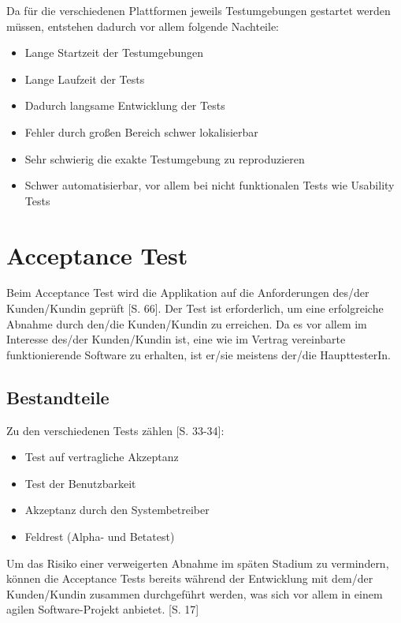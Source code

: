 \documentclass[a4paper,bibtotoc,oneside]{scrbook}
\begin{document}
Da für die verschiedenen Plattformen jeweils Testumgebungen gestartet werden müssen, entstehen dadurch vor allem folgende Nachteile:

\begin{itemize}
  \item Lange Startzeit der Testumgebungen
  \item Lange Laufzeit der Tests
  \item Dadurch langsame Entwicklung der Tests
  \item Fehler durch großen Bereich schwer lokalisierbar
  \item Sehr schwierig die exakte Testumgebung zu reproduzieren
  \item Schwer automatisierbar, vor allem bei nicht funktionalen Tests wie Usability Tests
\end{itemize}


\chapter{Acceptance Test}
Beim Acceptance Test wird die Applikation auf die Anforderungen des/der Kunden/Kundin geprüft \cite{test_large_systems}[S. 66]. Der Test ist erforderlich, um eine erfolgreiche Abnahme durch den/die Kunden/Kundin zu erreichen. Da es vor allem im Interesse des/der Kunden/Kundin ist, eine wie im Vertrag vereinbarte funktionierende Software zu erhalten, ist er/sie meistens der/die HaupttesterIn.

\section{Bestandteile}
Zu den verschiedenen Tests zählen \cite{betrieb}[S. 33-34]:

\begin{itemize}
   \item \glqq Test auf vertragliche Akzeptanz\grqq
   \item \glqq Test der Benutzbarkeit\grqq
   \item \glqq Akzeptanz durch den Systembetreiber\grqq
   \item \glqq Feldrest (Alpha- und Betatest)\grqq
 \end{itemize}

Um das Risiko einer verweigerten Abnahme im späten Stadium zu vermindern, können die Acceptance Tests bereits während der Entwicklung mit dem/der Kunden/Kundin zusammen durchgeführt werden, was sich vor allem in einem agilen Software-Projekt anbietet. \cite{eval_regression}[S. 17]
\end{document}
